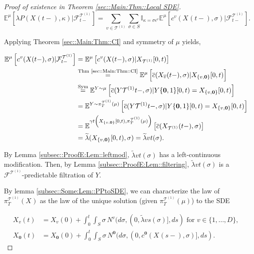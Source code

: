 \documentclass[12pt]{article}
\newcommand{\mb}{\mathbb}
\newcommand{\mc}{\mathcal}
\newcommand{\ov}{\overline}
\newcommand{\os}{\overset}
\newcommand{\te}{\text}
\newcommand{\ep}{\epsilon}
\newcommand{\ind}{\hspace{24pt}}
\newcommand{\exmu}[2]{\mb{E}^{#1}\left[#2\right]}	%
\renewcommand{\root}{\mathbf{0}}				%
\renewcommand{\v}{v}							%
\renewcommand{\S}{S}							%
\newcommand{\s}{\sigma}							%
\newcommand{\ev}{\ep}							%
\newcommand{\T}{T}								%
\renewcommand{\t}{t}							%
\newcommand{\proj}{\pi}							%
\renewcommand{\tt}{s}							%
\newcommand{\F}{\mc{F}}							%
\newcommand{\X}{X}								%
\newcommand{\IGr}{c}							%
\newcommand{\vind}[1]{^{#1}}					%
\newcommand{\vsi}[1]{^{#1}}						%
\newcommand{\cind}[1]{_{#1}}					%
\newcommand{\cl}{\ov}							%
\newcommand{\tp}[1]{(#1)}						%
\newcommand{\tip}[1]{#1}						%
\newcommand{\ts}[1]{_{#1}}						%
\newcommand{\degr}{D}							%
\newcommand{\IGrg}{\ov{c}}						%
\newcommand{\tree}{\mc{T}}						%
\newcommand{\sln}[1]{^{(#1)}}						%
\newcommand{\poiss}{N}							%
\newcommand{\rate}{\lambda}						%
\newcommand{\alt}[1]{\widetilde{#1}}			%
\newcommand{\m}{\mu}							%
\newcommand{\cm}{\gamma}						%
\newcommand{\XX}{Y}								%
\renewcommand{\mark}{\kappa}					%
\newcommand{\rp}{P}								%
\newcommand{\crate}{\alt{\lambda}}				%
\begin{document}
\begin{proof}[Proof of existence in Theorem \ref{sec::Main:Thm::Local SDE}]
\[\exmu{\m{}{}{}}{\rate{\rp{}}(\X\cind{}\tp{\t-},\mark{})|\F\vsi{\tree\sln{1}}\ts{\t-}} = \sum_{\v \in \tree\sln{1}}\sum_{\s\in \S} \mb{I}_{\mark{} = \s\ev\vind{\v}}\exmu{\m{}{}{}}{\IGr\vind{\v}(\X\cind{}\tp{\t-},\s)|\F\vsi{\tree\sln{1}}\ts{\t-}}.\]

Applying Theorem \ref{sec::Main:Thm::CI} and symmetry of \(\m{}{}{}\) yields,

\begin{align*}
\exmu{\m{}{}{}}{\IGr\vind{\v}(\X\cind{}\tp{\t-},\s)|\F\vsi{\tree\sln{1}}\ts{\t-}} &= \exmu{\m{}{}{}}{\IGr\vind{\v}(\X\cind{}\tp{\t-},\s)|\X\cind{\tree\sln{1}}\tip{[0,\t)}}\\
&\os{\te{Thm \ref{sec::Main:Thm::CI}}}{=} \exmu{\m{}{}{}}{\IGrg{}(\X\cind{\cl{\v}}\tp{\t-},\s)|\X\cind{\{\v,\root\}}\tip{[0,\t)}} \\
&\os{\te{Sym}}{=} \exmu{\XX{}{}\sim \m{}{}{}}{\IGrg{}(\XX{\tree\sln{1}}{\t-},\s)|\XX{\{\root,1\}}{[0,\t)} = \X\cind{\{\v,\root\}}\tip{[0,\t)}}\\
&= \exmu{\XX{}{}\sim \proj\vsi{\tree\sln{1}}\ts{\T}(\m{}{}{})}{\IGrg{}(\XX{\tree\sln{1}}{\t-},\s)|\XX{\{\root,1\}}{[0,\t)} = \X\cind{\{\v,\root\}}\tip{[0,\t)}}\\
&= \exmu{\cm{\t}\left(\X\cind{\{\v,\root\}}\tip{[0,\t)},\proj\vsi{\tree\sln{1}}\ts{\T}(\m{}{}{})\right)}{\IGrg{}(\X\cind{\tree\sln{1}}\tp{\t-},\s)}\\
&=\crate{}{}(\X\cind{\{\v,\root\}}\tip{[0,\t)},\s) = \crate{\v}{\t}(\s).
\end{align*}

By Lemma \ref{subsec::ProofE:Lem::leftmod}, \(\crate{\v}{\t}(\s)\) has a left-continuous modification. Then, by Lemma \ref{subsec::ProofE:Lem::filtering}, \(\crate{\v}{\t}(\s)\) is a \(\F\vsi{\tree\sln{1}}\ts{}\)-predictable filtration of \(\XX{}{}\).

\ind By lemma \ref{subsec::Some:Lem::PPtoSDE}, we can characterize the law of \(\proj\vsi{\tree\sln{1}}\ts{\T}(\X\cind{}\tip{})\) as the law of the unique solution (given \(\proj\vsi{\tree\sln{1}}\ts{\T}(\m{}{}{})\)) to the SDE

\begin{align*}
\X\cind{\v}\tp{\t} &= \X\cind{\v}\tp{0} + \int_0^\t\int_\S \s\,\poiss\vind{\v}(d\s,(0,\crate{\v}{\tt}(\s)],d\tt) \te{ for } \v \in \{1,\dots,\degr\},\\
\X\cind{\root}\tp{\t} &= \X\cind{\root}\tp{0} + \int_0^\t\int_\S \s\,\poiss\vind{\root}(d\s,(0,\IGr\vind{\root}(\X\cind{}\tp{\tt-},\s)],d\tt).
\end{align*}
\end{proof}
\end{document}

